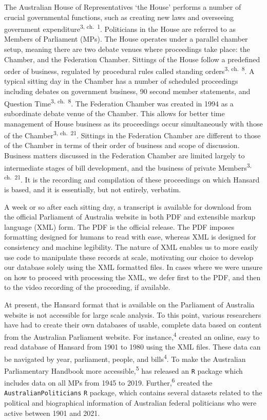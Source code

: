 \documentclass[
  letterpaper,
  DIV=11,
  numbers=noendperiod]{scrartcl}
\begin{document}
The Australian House of Representatives `the House' performs a number of
crucial governmental functions, such as creating new laws and overseeing
government expenditure\textsuperscript{3, ch.~1}. Politicians in the
House are referred to as Members of Parliament (MPs). The House operates
under a parallel chamber setup, meaning there are two debate venues
where proceedings take place: the Chamber, and the Federation Chamber.
Sittings of the House follow a predefined order of business, regulated
by procedural rules called standing orders\textsuperscript{3, ch.~8}. A
typical sitting day in the Chamber has a number of scheduled proceedings
including debates on government business, 90 second member statements,
and Question Time\textsuperscript{3, ch.~8}. The Federation Chamber was
created in 1994 as a subordinate debate venue of the Chamber. This
allows for better time management of House business as its proceedings
occur simultaneously with those of the Chamber\textsuperscript{3,
ch.~21}. Sittings in the Federation Chamber are different to those of
the Chamber in terms of their order of business and scope of discussion.
Business matters discussed in the Federation Chamber are limited largely
to intermediate stages of bill development, and the business of private
Members\textsuperscript{3, ch.~21}. It is the recording and compilation
of these proceedings on which Hansard is based, and it is essentially,
but not entirely, verbatim.

A week or so after each sitting day, a transcript is available for
download from the official Parliament of Australia website in both PDF
and extensible markup language (XML) form. The PDF is the official
release. The PDF imposes formatting designed for humans to read with
ease, whereas XML is designed for consistency and machine legibility.
The nature of XML enables us to more easily use code to manipulate these
records at scale, motivating our choice to develop our database solely
using the XML formatted files. In cases where we were unsure on how to
proceed with processing the XML, we defer first to the PDF, and then to
the video recording of the proceeding, if available.

At present, the Hansard format that is available on the Parliament of
Australia website is not accessible for large scale analysis. To this
point, various researchers have had to create their own databases of
usable, complete data based on content from the Australian Parliament
website. For instance,\textsuperscript{4} created an online, easy to
read database of Hansard from 1901 to 1980 using the XML files. These
data can be navigated by year, parliament, people, and
bills\textsuperscript{4}. To make the Australian Parliamentary Handbook
more accessible,\textsuperscript{5} has released an \texttt{R} package
which includes data on all MPs from 1945 to 2019.
Further,\textsuperscript{6} created the \texttt{AustralianPoliticians}
\texttt{R} package, which contains several datasets related to the
political and biographical information of Australian federal politicians
who were active between 1901 and 2021.
\end{document}
